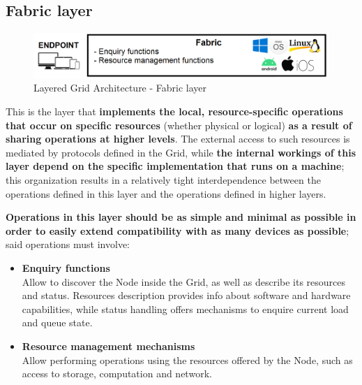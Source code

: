 \subsection{Fabric layer}
\begin{figure}[!ht]
    \centering
    \includegraphics[scale=0.35]{document/chapters/chapter_2/images/fabric_layer.png}
    \caption{Layered Grid Architecture - Fabric layer}
    \label{fig:fabric_layer}
\end{figure}

\noindent This is the layer that \textbf{implements the local, resource-specific operations that occur on specific resources} (whether physical or logical) \textbf{as a result of sharing operations at higher levels}. The external access to such resources is mediated by protocols defined in the Grid, while \textbf{the internal workings of this layer depend on the specific implementation that runs on a machine}; this organization results in a relatively tight interdependence between the operations defined in this layer and the operations defined in higher layers.
\vspace{30mm}

\textbf{Operations in this layer should be as simple and minimal as possible in order to easily extend compatibility with as many devices as possible}; said operations must involve:
\begin{itemize}
    \item \textbf{Enquiry functions}\\
    Allow to discover the Node inside the Grid, as well as describe its resources and status. Resources description provides info about software and hardware capabilities, while status handling offers mechanisms to enquire current load and queue state.
    \item \textbf{Resource management mechanisms}\\
    Allow performing operations using the resources offered by the Node, such as access to storage, computation and network.
\end{itemize} 
\vspace{5mm}

